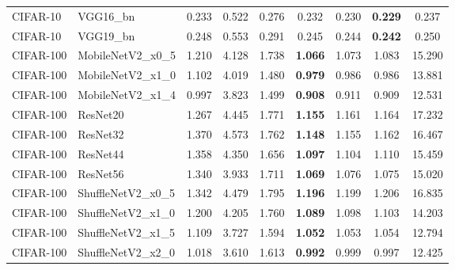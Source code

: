 \begin{table}[h!]
{\begin{tabular}{llccccccc}
 CIFAR-10 &          VGG16\_bn &         0.233 &        0.522 &    0.276 &                  0.232 &                  0.230 & \textbf{0.229} &                  0.237 \\
 CIFAR-10 &          VGG19\_bn &         0.248 &        0.553 &    0.291 &                  0.245 &                  0.244 & \textbf{0.242} &                  0.250 \\
CIFAR-100 &  MobileNetV2\_x0\_5 &         1.210 &        4.128 &    1.738 & \textbf{1.066} &                  1.073 &                  1.083 &                 15.290 \\
CIFAR-100 &  MobileNetV2\_x1\_0 &         1.102 &        4.019 &    1.480 & \textbf{0.979} &                  0.986 &                  0.986 &                 13.881 \\
CIFAR-100 &  MobileNetV2\_x1\_4 &         0.997 &        3.823 &    1.499 & \textbf{0.908} &                  0.911 &                  0.909 &                 12.531 \\
CIFAR-100 &          ResNet20 &         1.267 &        4.445 &    1.771 & \textbf{1.155} &                  1.161 &                  1.164 &                 17.232 \\
CIFAR-100 &          ResNet32 &         1.370 &        4.573 &    1.762 & \textbf{1.148} &                  1.155 &                  1.162 &                 16.467 \\
CIFAR-100 &          ResNet44 &         1.358 &        4.350 &    1.656 & \textbf{1.097} &                  1.104 &                  1.110 &                 15.459 \\
CIFAR-100 &          ResNet56 &         1.340 &        3.933 &    1.711 & \textbf{1.069} &                  1.076 &                  1.075 &                 15.020 \\
CIFAR-100 & ShuffleNetV2\_x0\_5 &         1.342 &        4.479 &    1.795 & \textbf{1.196} &                  1.199 &                  1.206 &                 16.835 \\
CIFAR-100 & ShuffleNetV2\_x1\_0 &         1.200 &        4.205 &    1.760 & \textbf{1.089} &                  1.098 &                  1.103 &                 14.203 \\
CIFAR-100 & ShuffleNetV2\_x1\_5 &         1.109 &        3.727 &    1.594 & \textbf{1.052} &                  1.053 &                  1.054 &                 12.794 \\
CIFAR-100 & ShuffleNetV2\_x2\_0 &         1.018 &        3.610 &    1.613 & \textbf{0.992} &                  0.999 &                  0.997 &                 12.425 \\

\end{tabular}}
\end{table}
